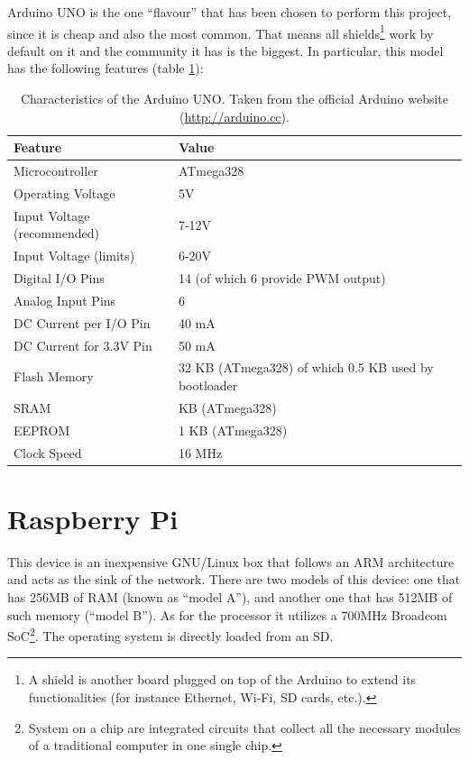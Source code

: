 Arduino UNO is the one ``flavour'' that has been chosen to perform this project, since it is cheap and also the most common. That means all shields\footnote{A shield is another board plugged on top of the Arduino to extend its functionalities (for instance Ethernet, Wi-Fi, SD cards, etc.).}  work by default on it and the community it has is the biggest. In particular, this model has the following features (table \ref{tab:arduinofeatures}):
\\

\begin{table}[ht] 
\centering
\begin{tabular}{l|l}
    Feature     & Value\\
\hline
Microcontroller	& ATmega328\\
Operating Voltage &	5V\\
Input Voltage (recommended) & 7-12V\\
Input Voltage (limits) & 6-20V\\
Digital I/O Pins & 14 (of which 6 provide PWM output)\\
Analog Input Pins & 6\\
DC Current per I/O Pin & 40 mA\\
DC Current for 3.3V Pin & 50 mA\\
Flash Memory & 32 KB (ATmega328) of which 0.5 KB used by bootloader\\
SRAM & KB (ATmega328)\\
EEPROM &	1 KB (ATmega328)\\
Clock Speed &	16 MHz\\
\end{tabular}
\caption{Characteristics of the Arduino UNO. Taken from the official Arduino website (\url{http://arduino.cc}).}
\label{tab:arduinofeatures}
\end{table}


\section{Raspberry Pi}

This device is an inexpensive GNU/Linux box that follows an ARM architecture and acts as the sink of the network. There are two models of this device: one that has 256MB of RAM (known as ``model A''), and another one that has 512MB of such memory (``model B''). As for the processor it utilizes a 700MHz Broadcom SoC\footnote{System on a chip are integrated circuits that collect all the necessary modules of a traditional computer in one single chip.}. The operating system is directly loaded from an SD.

